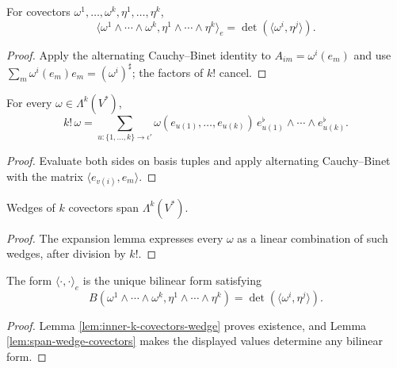 \begin{lemma}
\label{lem:inner-k-covectors-wedge}
\leanok
{}
For covectors $\omega^1,\ldots,\omega^k,\eta^1,\ldots,\eta^k$,
\[
\langle\omega^1\wedge\cdots\wedge\omega^k,\eta^1\wedge\cdots\wedge\eta^k\rangle_e=\det(\langle\omega^i,\eta^j\rangle).
\]
\end{lemma}
\begin{proof}
\leanok
{}
\sketch Apply the alternating Cauchy--Binet identity to $A_{im}=\omega^i(e_m)$ and use $\sum_m\omega^i(e_m)e_m=(\omega^i)^\sharp$; the factors of $k!$ cancel.
\end{proof}

\begin{lemma}
\label{lem:k-covector-wedge-expansion}
\leanok
{}
For every $\omega\in\Lambda^k(V^*)$,
\[
k!\,\omega=\sum_{u:\{1,\ldots,k\}\to\iota'}\omega(e_{u(1)},\ldots,e_{u(k)})\,e_{u(1)}^\flat\wedge\cdots\wedge e_{u(k)}^\flat.
\]
\end{lemma}
\begin{proof}
\leanok
{}
\sketch Evaluate both sides on basis tuples and apply alternating Cauchy--Binet with the matrix $\langle e_{v(i)},e_m\rangle$.
\end{proof}

\begin{lemma}
\label{lem:span-wedge-covectors}
\leanok
{}
Wedges of $k$ covectors span $\Lambda^k(V^*)$.
\end{lemma}
\begin{proof}
\leanok
{}
\sketch The expansion lemma expresses every $\omega$ as a linear combination of such wedges, after division by $k!$.
\end{proof}

\begin{proposition}
\label{prop:inner-k-covectors-unique}
\leanok
{}
The form $\langle\cdot,\cdot\rangle_e$ is the unique bilinear form satisfying
\[
B(\omega^1\wedge\cdots\wedge\omega^k,\eta^1\wedge\cdots\wedge\eta^k)=\det(\langle\omega^i,\eta^j\rangle).
\]
\end{proposition}
\begin{proof}
\leanok
{}
\sketch Lemma \ref{lem:inner-k-covectors-wedge} proves existence, and Lemma \ref{lem:span-wedge-covectors} makes the displayed values determine any bilinear form.
\end{proof}

